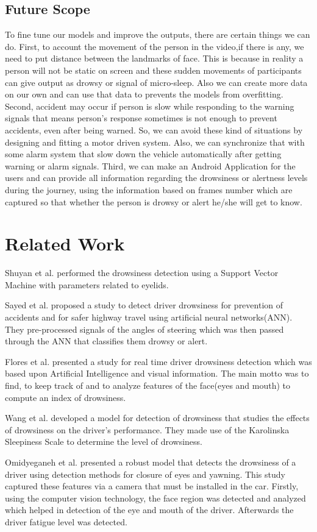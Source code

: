 \documentclass{article}
\begin{document}
\newpage
\subsection{Future Scope}
To fine tune our models and improve the outputs, there are certain things we can do.
First, to account the movement of the person in the video,if there is any, we need to put distance between the landmarks of face. This is because in reality a person will not be static on screen and these sudden movements of participants can give output as drowsy or signal of micro-sleep. Also we can create more data on our own and can use that data to prevents the models from overfitting.
Second, accident may occur if person is slow while responding to the warning signals that means person’s response sometimes is not enough to prevent accidents, even after being warned. So, we can avoid these kind of situations by designing and fitting a motor driven system. Also, we can synchronize that with some alarm system that slow down the vehicle automatically after getting warning or alarm signals.
Third, we can make an Android Application for the users and can provide all information regarding the drowsiness or alertness levels during the journey, using the information based on frames number which are captured so that whether the person is drowsy or alert he/she will get to know.


\newpage

\section{Related Work}

Shuyan et al. \cite{hu2009driver} performed the drowsiness detection using a Support Vector Machine with parameters related to eyelids.

Sayed et al. \cite{sayed2001unobtrusive} proposed a study to detect driver drowsiness for prevention of accidents and for safer highway travel using artificial neural networks(ANN). They pre-processed signals of the angles of steering which was then passed through the ANN that classifies them drowsy or alert.

Flores et al. \cite{flores2010real} presented a study for real time driver drowsiness detection which was based upon Artificial Intelligence and visual information. The main motto was to find, to keep track of and to analyze features of the face(eyes and mouth) to compute an index of drowsiness.

Wang et al. \cite{wang2016driver} developed a model for detection of drowsiness that studies the effects of drowsiness on the driver's performance. They made use of the Karolinska Sleepiness Scale to determine the level of drowsiness.
 
Omidyeganeh et al. \cite{omidyeganeh2011intelligent} presented a robust model that detects the drowsiness of a driver using detection methods for closure of eyes and yawning. This study captured these features via a camera that must be installed in the car. Firstly, using the computer vision technology, the face region was detected and analyzed which helped in detection of the eye and mouth of the driver. Afterwards the driver fatigue level was detected.



	
\end{document}
